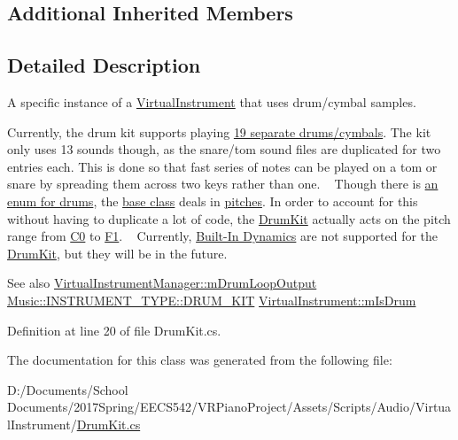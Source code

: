 \subsection*{Additional Inherited Members}


\subsection{Detailed Description}
A specific instance of a \hyperlink{class_virtual_instrument}{Virtual\+Instrument} that uses drum/cymbal samples. 

Currently, the drum kit supports playing \hyperlink{group___music_enums_gade475b4382c7066d1af13e7c13c029b6}{19 separate drums/cymbals}. The kit only uses 13 sounds though, as the snare/tom sound files are duplicated for two entries each. This is done so that fast series of notes can be played on a tom or snare by spreading them across two keys rather than one. ~\newline
Though there is \hyperlink{group___music_enums_gade475b4382c7066d1af13e7c13c029b6}{an enum for drums}, the \hyperlink{group___v_i_base}{base class} deals in \hyperlink{group___music_enums_ga508f69b199ea518f935486c990edac1d}{pitches}. In order to account for this without having to duplicate a lot of code, the \hyperlink{class_drum_kit}{Drum\+Kit} actually acts on the pitch range from \hyperlink{group___music_enums_gga508f69b199ea518f935486c990edac1da9c5959e6f08f10d0edbadf5be1f33c53}{C0} to \hyperlink{group___music_enums_gga508f69b199ea518f935486c990edac1dae1dffc8709f31a4987c8a88334107e89}{F1}. ~\newline
 Currently, \hyperlink{group___audio_DefBID}{Built-\/\+In Dynamics} are not supported for the \hyperlink{class_drum_kit}{Drum\+Kit}, but they will be in the future. \begin{DoxySeeAlso}{See also}
\hyperlink{group___v_i_m_priv_ga5f71cb71d240042312dcc13b481b068d}{Virtual\+Instrument\+Manager\+::m\+Drum\+Loop\+Output} \hyperlink{group___music_enums_ggabfce60192305965558a36e368ebd67c3aceaaf30d57fed4b1c3f4b95c60a76df6}{Music\+::\+I\+N\+S\+T\+R\+U\+M\+E\+N\+T\+\_\+\+T\+Y\+P\+E\+::\+D\+R\+U\+M\+\_\+\+K\+IT} \hyperlink{group___v_i_base_pro_var_ga47dbd8aa02ab32b8f802adfd2d3d81de}{Virtual\+Instrument\+::m\+Is\+Drum} 
\end{DoxySeeAlso}


Definition at line 20 of file Drum\+Kit.\+cs.



The documentation for this class was generated from the following file\+:\begin{DoxyCompactItemize}
\item 
D\+:/\+Documents/\+School Documents/2017\+Spring/\+E\+E\+C\+S542/\+V\+R\+Piano\+Project/\+Assets/\+Scripts/\+Audio/\+Virtual\+Instrument/\hyperlink{_drum_kit_8cs}{Drum\+Kit.\+cs}\end{DoxyCompactItemize}
